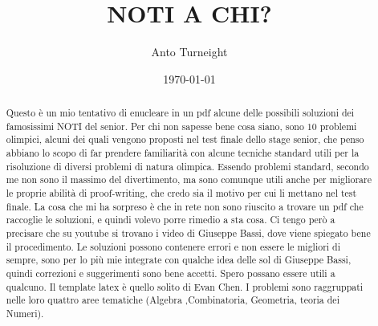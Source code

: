 \documentclass[11pt]{scrartcl}
\title{NOTI A CHI?}
\author{Anto Turneight}
\date{\today}
\begin{document}
\maketitle
 \begin{abstract}
Questo è un mio tentativo di enucleare in un pdf alcune delle possibili
soluzioni dei famosissimi NOTI del senior. Per chi non sapesse bene cosa siano,
sono $10$ problemi olimpici, alcuni dei quali vengono proposti nel test finale
dello stage senior, che penso abbiano lo scopo di far prendere familiarità
con alcune tecniche standard utili per la risoluzione di diversi problemi di
natura olimpica. Essendo problemi standard, secondo me non sono il massimo del
divertimento, ma sono comunque utili anche per migliorare le proprie abilità
di proof-writing, che credo sia il motivo per cui li mettano nel test finale.
La cosa che mi ha sorpreso è che in rete non sono riuscito a trovare un
pdf che raccoglie le soluzioni, e quindi volevo porre rimedio a sta cosa.
Ci tengo però a precisare che su youtube si trovano i video di Giuseppe Bassi, dove
viene spiegato bene il procedimento.
Le soluzioni possono contenere errori e non essere le migliori di sempre,
sono per lo più mie integrate con qualche idea delle sol di Giuseppe Bassi,
quindi correzioni e suggerimenti sono bene accetti. Spero
possano essere utili a qualcuno. Il template latex è quello solito di
Evan Chen. I problemi sono raggruppati nelle loro quattro aree tematiche (Algebra
,Combinatoria, Geometria, teoria dei Numeri).
 \end{abstract}

 \tableofcontents


\newpage
\end{document}
